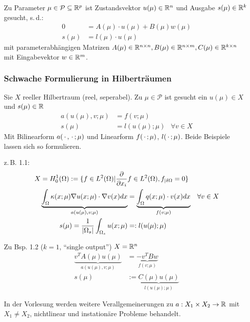 \begin{bsp}
Zu Parameter $\mu \in \mathcal{P} \subseteq \mathbb{R}^p$ ist Zustandsvektor $u(\mu) \in \mathbb{R}^n$ und Ausgabe $s(\mu) \in \mathbb{R}^k$ gesucht, s.\,d.:
\begin{align*}
	0 &= A(\mu) \cdot u(\mu) + B(\mu) w(\mu) \\
	s(\mu) &= l(\mu) \cdot u(\mu)
\end{align*} 
mit parameterabhängigen Matrizen $A(\mu) \in \mathbb{R}^{n\times n}, B(\mu) \in \mathbb{R}^{n\times m}, C(\mu) \in \mathbb{R}^{k \times n}$ mit Eingabevektor $w \in \mathbb{R}^m$.
\end{bsp}

\subsubsection*{Schwache Formulierung in Hilberträumen}
\label{Schwache Formulierung in Hilberträumen}

Sie $X$ reeller Hilbertraum (reel, seperabel). Zu $\mu \in \mathcal{P}$ ist gesucht ein $u(\mu) \in X$ und $s(\mu) \in \mathbb{R}$
\begin{align*}
	a(u(\mu),v; \mu) &= f(v; \mu) \\
	s(\mu) &= l(u(\mu); \mu) & \forall v \in X
\end{align*}
Mit Bilinearform $a(\,\cdot\,,\,\cdot\,; \mu)$ und Linearform $f(\,\cdot\,; \mu)$, $l(\,\cdot\,; \mu)$. Beide Beispiele lassen sich so formulieren.

z.\,B. 1.1: 
\begin{align*}
	X=H_0^1(\Omega):=\{f\in L^2(\Omega) | \frac{\partial}{\partial {x_i}}& f \in L^2(\Omega), f_{|\delta\Omega} = 0\} \\
	\underbrace{\int_{\Omega} \kappa (x; \mu) \nabla u(x; \mu) \cdot \nabla v(x) dx}_{a(u(\mu),v; \mu)} &= \underbrace{\int_{\Omega} q(x; \mu) \cdot v(x) dx}_{f(v; \mu)} &\forall v \in X \\
	s(\mu) = \frac{1}{|\Omega_s|} \int_{\Omega_s} u(x; \mu) &=: l(u(\mu); \mu)
\end{align*}

Zu Bsp. 1.2 ($k=1$, "`single output"') \qquad $X = \mathbb{R}^n$
\begin{align*}
	\underbrace{v^TA(\mu)u(\mu)}_{a(u(\mu),v; \mu)} &= \underbrace{-v^TBw}_{f(v; \mu)} \\
	s(\mu) &:= \underbrace{C(\mu)u(\mu)}_{l(u(\mu); \mu)}
\end{align*}

In der Vorlesung werden weitere Verallgemeinerungen zu $a:X_1 \times X_2 \rightarrow \mathbb{R}$ mit $X_1 \neq X_2$, nichtlinear und instationäre Probleme behandelt.

